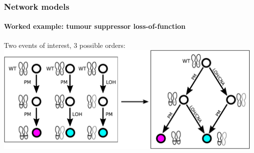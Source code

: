 \documentclass{beamer}
\begin{document}
\begin{frame}
    \frametitle{Network models}
    \framesubtitle{Worked example: tumour suppressor loss-of-function}
    \begin{center}
    Two events of interest, 3 possible orders:
    \includegraphics[width=1.0\textwidth]{figures/diagram4b}
    \end{center}
    \begin{columns}
        \begin{column}{0.12\textwidth}
        \begin{center}

\end{center}
\end{column}
\end{columns}
\end{frame}
\end{document}

